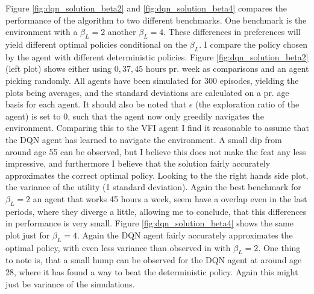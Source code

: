 Figure \ref{fig:dqn_solution_beta2} and \ref{fig:dqn_solution_beta4} compares the performance of the algorithm to two different benchmarks. One benchmark is the environment with a $\beta_L = 2$ another $\beta_L=4$. These differences in preferences will yield different optimal policies conditional on the $\beta_L$. I compare the policy chosen by the agent with different deterministic policies. Figure \ref{fig:dqn_solution_beta2} (left plot) shows either using $0, 37, 45$ hours pr. week as comparisons and an agent picking randomly. All agents have been simulated for 300 episodes, yielding the plots being averages, and the standard deviations are calculated on a pr. age basis for each agent. It should also be noted that $\epsilon$ (the exploration ratio of the agent) is set to 0, such that the agent now only greedily navigates the environment. Comparing this to the VFI agent I find  it reasonable to assume that the DQN agent has learned to navigate the environment. A small dip from around age 55 can be observed, but I believe this does not make the feat any less impressive, and furthermore I believe that the solution fairly accurately approximates the correct optimal policy. Looking to the the right hands side plot, the variance of the utility (1 standard deviation). Again the best benchmark for $\beta_L = 2$ an agent that works 45 hours a week, seem have a overlap even in the last periods, where they diverge a little, allowing me to conclude, that this differences in performance is very small. Figure \ref{fig:dqn_solution_beta4} shows the same plot just for $\beta_L = 4$. Again the DQN agent fairly accurately approximates the optimal policy, with even less variance than observed in with $\beta_L = 2$. One thing to note is, that a small hump can be observed for the DQN agent at around age 28, where it has found a way to beat the deterministic policy. Again this might just be variance of the simulations. 


